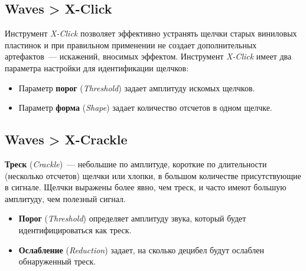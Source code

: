 \documentclass{beamer}
\begin{document}
\subsection{Waves > X-Click}
\begin{frame}
Инструмент \emph{X-Click} позволяет эффективно устранять щелчки старых виниловых пластинок и при правильном применении не создает дополнительных артефактов~--- искажений, вносимых эффектом. Инструмент \emph{X-Click} имеет два параметра настройки для идентификации щелчков:
\begin{itemize}
  \item Параметр \textbf{порог} (\textit{Threshold}) задает амплитуду искомых щелчков. 
  \item Параметр \textbf{форма} (\textit{Shape}) задает количество отсчетов в одном щелчке. 
\end{itemize}

\end{frame}

\subsection{Waves > X-Crackle}
\begin{frame}
\textbf{Треск} (\emph{Crackle})~--- небольшие по амплитуде, короткие по длительности (несколько отсчетов) щелчки или хлопки, в большом количестве присутствующие в сигнале. Щелчки выражены более явно, чем треск, и часто имеют большую амплитуду, чем полезный сигнал. 

\begin{itemize}
  \item \textbf{Порог} (\emph{Threshold}) определяет амплитуду звука, который будет идентифицироваться как треск. 
  \item \textbf{Ослабление} (\emph{Reduction}) задает, на сколько децибел будут ослаблен обнаруженный треск.
\end{itemize}

\end{frame}
\end{document}
